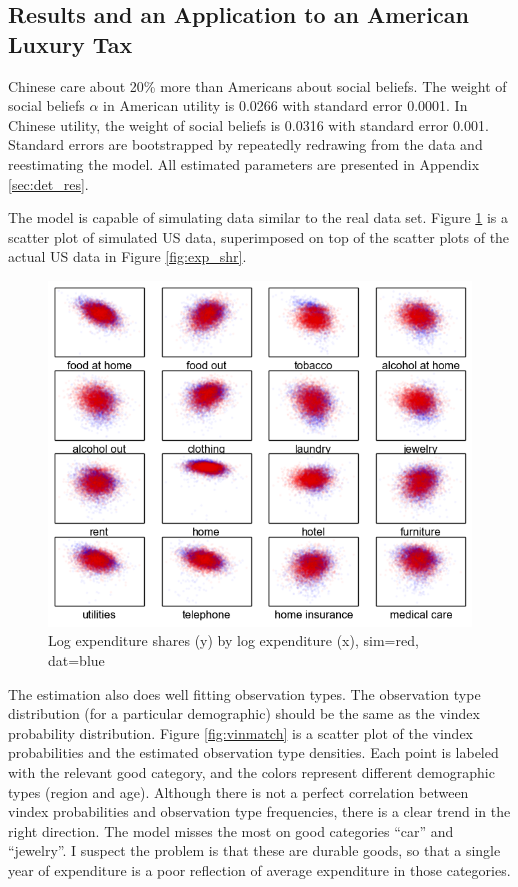 \documentclass[11pt]{article}
\begin{document}
\begin{CJK}{UTF8}{gbsn}
\section{Results and an Application to an American Luxury Tax}
\label{sec:results}

Chinese care about 20\% more than Americans about social beliefs.  The weight of social beliefs $\alpha$ in American utility is 0.0266 with standard error 0.0001.  In Chinese utility, the weight of social beliefs is 0.0316 with standard error 0.001.  Standard errors are bootstrapped by repeatedly redrawing from the data and reestimating the model.  All estimated parameters are presented in Appendix \ref{sec:det_res}.

The model is capable of simulating data similar to the real data set. Figure \ref{fig:shares_fake} is a scatter plot of simulated US data, superimposed on top of the scatter plots of the actual US data in Figure \ref{fig:exp_shr}.
\begin{figure} \centering \includegraphics[scale=1]{pics/shr_plot_sim.png}
	\caption{Log expenditure shares (y) by log expenditure (x), sim=red, dat=blue}
	\label{fig:shares_fake}
\end{figure}
The estimation also does well fitting observation types.
The observation type distribution (for a particular demographic) should be the same as the vindex probability distribution.
Figure \ref{fig:vinmatch} is a scatter plot of the vindex probabilities and the estimated observation type densities.  Each point is labeled with the relevant good category, and the colors represent different demographic types (region and age). Although there is not a perfect correlation between vindex probabilities and observation type frequencies, there is a clear trend in the right direction.  The model misses the most on good categories ``car'' and ``jewelry''.  I suspect the problem is that these are durable goods, so that a single year of expenditure is a poor reflection of average expenditure in those categories.

\end{CJK}
\end{document}
